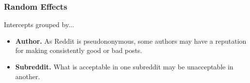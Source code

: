 \subsubsection{Random Effects}

Intercepts grouped by...
\begin{itemize}
\item{\textbf{Author.} As Reddit is pseudononymous, some authors may have a reputation for making consistently good or bad posts.}
\item{\textbf{Subreddit.} What is acceptable in one subreddit may be unacceptable in another.}
\end{itemize}
